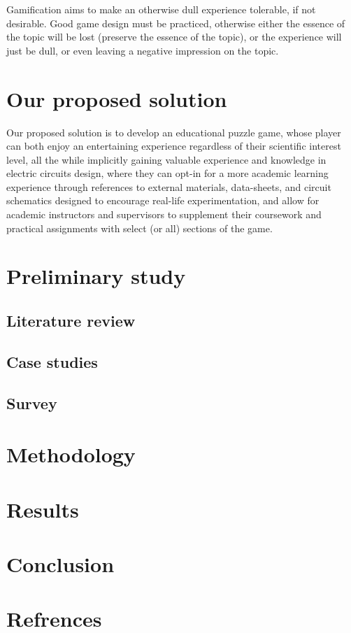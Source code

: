 \documentclass[twoside,a4paper,11pt]{article}
\begin{document}
\begin{multicols}{2}
Gamification aims to make an otherwise dull experience tolerable, if not desirable. Good game design must be practiced, otherwise either the essence of the topic will be lost (preserve the essence of the topic), or the experience will just be dull, or even leaving a negative impression on the topic.

\section{Our proposed solution}

Our proposed solution is to develop an educational puzzle game, whose player can both enjoy an entertaining experience regardless of their scientific interest level, all the while implicitly gaining valuable experience and knowledge in electric circuits design, where they can opt-in for a more academic learning experience through references to external materials, data-sheets, and circuit schematics designed to encourage real-life experimentation, and allow for academic instructors and supervisors to supplement their coursework and practical assignments with select (or all) sections of the game.
\section{Preliminary study}
\subsection{Literature review}
\lipsum[0-1]
\subsection{Case studies}
\lipsum[0-1]
\subsection{Survey}
\lipsum[0-1]
\section{Methodology}
\lipsum[0-1]
\section{Results}
\lipsum[0-1]
\section{Conclusion}
\lipsum[0-1]
\section{Refrences}
\lipsum[0-1]
\end{multicols}
\end{document}
